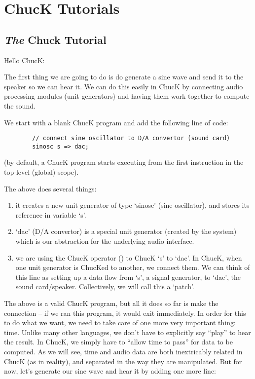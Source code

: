 \chapter{ChucK Tutorials}

\section{{\it The} Chuck Tutorial}
Hello ChucK: 

The first thing we are going to do is do generate a sine wave and send it to the speaker so we can hear it. We can do this easily in ChucK by connecting audio processing modules (unit generators) and having them work together to compute the sound. 

We start with a blank ChucK program and add the following line of code:
\begin{verbatim}
        // connect sine oscillator to D/A convertor (sound card)
        sinosc s => dac;
\end{verbatim}
(by default, a ChucK program starts executing from the first instruction in the top-level (global) scope).

The above does several things:
\begin{enumerate}
\item it creates a new unit generator of type `sinosc' (sine oscillator), and stores its reference in variable `s'.
\item `dac' (D/A convertor) is a special unit generator (created by the system) which is our abstraction for the underlying audio interface.
\item we are using the ChucK operator (\chuckop) to ChucK `s' to `dac'. In ChucK, when one unit generator is ChucKed to another, we connect them. We can think of this line as setting up a data flow from `s', a signal generator, to `dac', the sound card/speaker. Collectively, we will call this a `patch'. 
\end{enumerate}

The above is a valid ChucK program, but all it does so far is make the connection -- if we ran this program, it would exit immediately. In order for this to do what we want, we need to take care of one more very important thing: time. Unlike many other languages, we don't have to explicitly say ``play'' to hear the result. In ChucK, we simply have to ``allow time to pass'' for data to be computed. As we will see, time and audio data are both inextricably related in ChucK (as in reality), and separated in the way they are manipulated. But for now, let's generate our sine wave and hear it by adding one more line:

